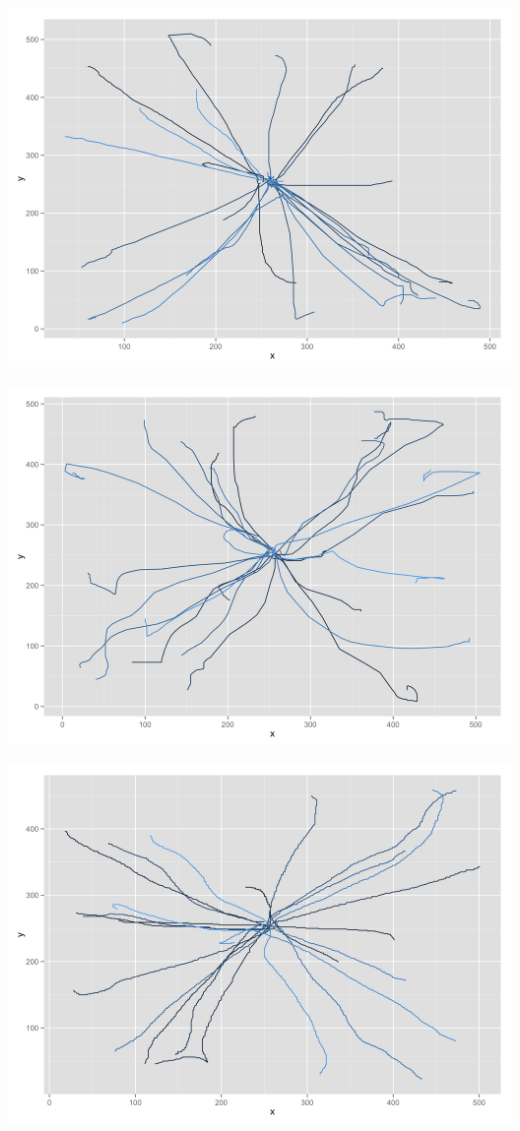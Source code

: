 \begin{appendices}
\begin{minipage}{\textwidth}
\begin{minipage}{0.5\linewidth}
		\includegraphics[width=\linewidth]{images/plots/plot_analysis_qualitative_3}
	\end{minipage}
	\begin{minipage}{0.5\linewidth}
		\includegraphics[width=\linewidth]{images/plots/plot_analysis_qualitative_78}
	\end{minipage}
	\begin{minipage}{0.5\linewidth}
		\includegraphics[width=\linewidth]{images/plots/plot_analysis_qualitative_171}

\end{minipage}
\end{minipage}
\end{appendices}
